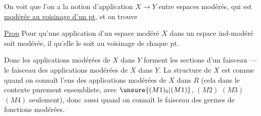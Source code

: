 On voit  que l'on a la notion d'application $X\longrightarrow Y$ entre espaces modérés, qui est \uline{modérée au voisinage d'un pt}, et on trouve

\uline{Prop} Pour qu'une application d'un espace modéré $X$ dans un espace ind-modéré soit modérée, il  qu'elle le soit au voisinage de chaque pt.

Donc les applications modérées de $X$ dans $Y$ forment les sections d'un faisceau --- le faisceau des applications modérées de $X$ dans $Y$. La structure  de $X$ est connue quand on connaît l'ens des applications modérées de $X$ dans $R$ (cela  dans le contexte purement ensembliste, avec $\unsure{(M1)_0|(M1)}$, $(M2)$ $(M3)$ $(M4)$ seulement), donc aussi quand on connaît le faisceau des germes de fonctions modérées.
